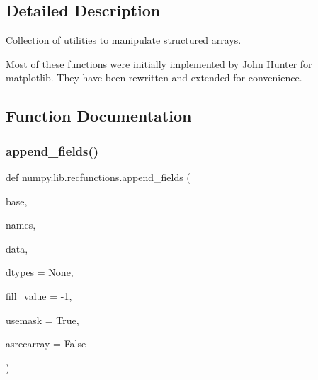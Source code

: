 \subsection{Detailed Description}
\begin{DoxyVerb}Collection of utilities to manipulate structured arrays.

Most of these functions were initially implemented by John Hunter for
matplotlib.  They have been rewritten and extended for convenience.\end{DoxyVerb}
 

\subsection{Function Documentation}
\mbox{\label{namespacenumpy_1_1lib_1_1recfunctions_a825baec922c4794416c1dee8f815e0d7}} 
\subsubsection{\texorpdfstring{append\+\_\+fields()}{append\_fields()}}
{\footnotesize\ttfamily def numpy.\+lib.\+recfunctions.\+append\+\_\+fields (\begin{DoxyParamCaption}\item[{}]{base,  }\item[{}]{names,  }\item[{}]{data,  }\item[{}]{dtypes = {\ttfamily None},  }\item[{}]{fill\+\_\+value = {\ttfamily -\/1},  }\item[{}]{usemask = {\ttfamily True},  }\item[{}]{asrecarray = {\ttfamily False} }\end{DoxyParamCaption})}

